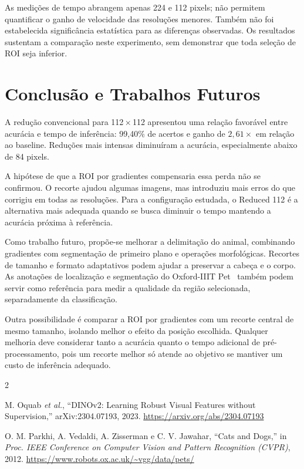 \documentclass[conference]{IEEEtran}
\begin{document}
As medições de tempo abrangem apenas 224 e 112 pixels; não permitem
quantificar o ganho de velocidade das resoluções menores. Também
não foi estabelecida significância estatística para as diferenças
observadas. Os resultados sustentam a comparação neste experimento,
sem demonstrar que toda seleção de ROI seja inferior.

\section{Conclusão e Trabalhos Futuros}
A redução convencional para 112\,$\times$\,112 apresentou uma relação
favorável entre acurácia e tempo de inferência: 99,40\% de acertos e
ganho de $2{,}61\times$ em relação ao baseline. Reduções mais intensas
diminuíram a acurácia, especialmente abaixo de 84 pixels.

A hipótese de que a ROI por gradientes compensaria essa perda não
se confirmou. O recorte ajudou algumas imagens, mas introduziu mais
erros do que corrigiu em todas as resoluções. Para a configuração
estudada, o Reduced 112 é a alternativa mais adequada quando se busca
diminuir o tempo mantendo a acurácia próxima à referência.

Como trabalho futuro, propõe-se melhorar a delimitação do animal,
combinando gradientes com segmentação de primeiro plano e operações
morfológicas. Recortes de tamanho e formato adaptativos podem ajudar
a preservar a cabeça e o corpo. As anotações de localização e
segmentação do Oxford-IIIT Pet~\cite{pets} também podem servir como
referência para medir a qualidade da região selecionada, separadamente
da classificação.

Outra possibilidade é comparar a ROI por gradientes com um recorte
central de mesmo tamanho, isolando melhor o efeito da posição
escolhida. Qualquer melhoria deve considerar tanto a acurácia quanto
o tempo adicional de pré-processamento, pois um recorte melhor só
atende ao objetivo se mantiver um custo de inferência adequado.

\begin{thebibliography}{2}

M. Oquab \textit{et al.}, ``DINOv2: Learning Robust Visual Features
without Supervision,'' arXiv:2304.07193, 2023.
\url{https://arxiv.org/abs/2304.07193}

O. M. Parkhi, A. Vedaldi, A. Zisserman e C. V. Jawahar,
``Cats and Dogs,'' in \textit{Proc. IEEE Conference on Computer Vision
and Pattern Recognition (CVPR)}, 2012.
\url{https://www.robots.ox.ac.uk/~vgg/data/pets/}

\end{thebibliography}
\end{document}
